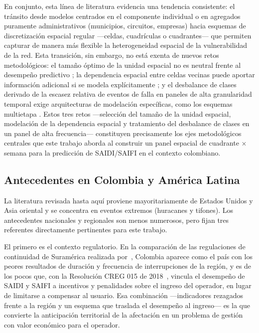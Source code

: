 En conjunto, esta línea de literatura evidencia una tendencia consistente: el tránsito desde modelos centrados en el componente individual o en agregados puramente administrativos (municipios, circuitos, empresas) hacia esquemas de discretización espacial regular —celdas, cuadrículas o cuadrantes— que permiten capturar de manera más flexible la heterogeneidad espacial de la vulnerabilidad de la red. Esta transición, sin embargo, no está exenta de nuevos retos metodológicos: el tamaño óptimo de la unidad espacial no es neutral frente al desempeño predictivo \parencite{ref68liu}; la dependencia espacial entre celdas vecinas puede aportar información adicional si se modela explícitamente \parencite{ref14}; y el desbalance de clases derivado de la escasez relativa de eventos de falla en paneles de alta granularidad temporal exige arquitecturas de modelación específicas, como los esquemas multietapa \parencite{ref42}. Estos tres retos —selección del tamaño de la unidad espacial, modelación de la dependencia espacial y tratamiento del desbalance de clases en un panel de alta frecuencia— constituyen precisamente los ejes metodológicos centrales que este trabajo aborda al construir un panel espacial de cuadrante $\times$ semana para la predicción de SAIDI/SAIFI en el contexto colombiano.

\subsection{Antecedentes en Colombia y América Latina}
\label{sec:antecedentes_nacionales}

La literatura revisada hasta aquí proviene mayoritariamente de Estados Unidos y Asia oriental y se concentra en eventos extremos (huracanes y tifones). Los antecedentes nacionales y regionales son menos numerosos, pero fijan tres referentes directamente pertinentes para este trabajo.

El primero es el contexto regulatorio. En la comparación de las regulaciones de continuidad de Suramérica realizada por~\textcite{delavechia2023}, Colombia aparece como el país con los peores resultados de duración y frecuencia de interrupciones de la región, y es de los pocos que, con la Resolución CREG 015 de 2018~\cite{ref1}, vincula el desempeño de SAIDI y SAIFI a incentivos y penalidades sobre el ingreso del operador, en lugar de limitarse a compensar al usuario. Esa combinación ---indicadores rezagados frente a la región y un esquema que traslada el desempeño al ingreso--- es la que convierte la anticipación territorial de la afectación en un problema de gestión con valor económico para el operador.

